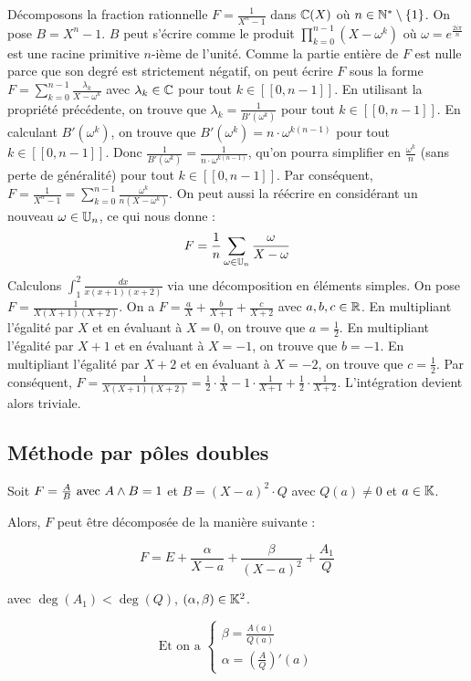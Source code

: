 \documentclass[12pt, a4paper]{report}
\begin{document}
\begin{example}
    \begin{outline}
        \1 Décomposons la fraction rationnelle $F = \frac{1}{X^n -1}$ dans $\mathbb{C}(X)$ où $n \in \mathbb{N}^*\setminus \{1\}$.
        \2 On pose $B= X^n - 1$.
        \2 $B$ peut s'écrire comme le produit $\prod_{k=0}^{n-1} (X - \omega^k)$ où $\omega = e^{\frac{2i\pi}{n}}$ est une racine primitive $n$-ième de l'unité.
        \2 Comme la partie entière de $F$ est nulle parce que son degré est strictement négatif, on peut écrire $F$ sous la forme $F = \sum_{k=0}^{n-1} \frac{\lambda_k}{X - \omega^k}$ avec $\lambda_k \in \mathbb{C}$ pour tout $k \in [\![0,n-1]\!]$.
        \2 En utilisant la propriété précédente, on trouve que $\lambda_k = \frac{1}{B'(\omega^k)}$ pour tout $k \in [\![0,n-1]\!]$.
        \2 En calculant $B'(\omega^k)$, on trouve que $B'(\omega^k) = n \cdot \omega^{k(n-1)}$ pour tout $k \in [\![0,n-1]\!]$.
        \2 Donc $\frac{1}{B'(\omega^k)} = \frac{1}{n \cdot \omega^{k(n-1)}}$, qu'on pourra simplifier en $\frac{\omega^k}{n}$ (sans perte de généralité) pour tout $k \in [\![0,n-1]\!]$.
        \2 Par conséquent, $F = \frac{1}{X^n - 1} = \sum_{k=0}^{n-1} \frac{\omega^k}{n(X - \omega^k)}$.
        \2 On peut aussi la réécrire en considérant un nouveau $\omega \in \mathbb{U}_n$, ce qui nous donne :
        $$F = \frac1n \sum_{\omega \in \mathbb{U}_n} \frac{\omega}{X - \omega}$$
        \1 Calculons $\int_1^2 \frac{dx}{x(x+1)(x+2)}$ via une décomposition en éléments simples.
        \2 On pose $F = \frac{1}{X(X+1)(X+2)}$.
        \2 On a $F = \frac{a}{X} + \frac{b}{X+1} + \frac{c}{X+2}$ avec $a,b,c \in \mathbb{R}$.
        \2 En multipliant l'égalité par $X$ et en évaluant à $X=0$, on trouve que $a = \frac12$.
        \2 En multipliant l'égalité par $X+1$ et en évaluant à $X=-1$, on trouve que $b = -1$.
        \2 En multipliant l'égalité par $X+2$ et en évaluant à $X=-2$, on trouve que $c = \frac12$.
        \2 Par conséquent, $F = \frac{1}{X(X+1)(X+2)} = \frac12 \cdot \frac{1}{X} - 1 \cdot \frac{1}{X+1} + \frac12 \cdot \frac{1}{X+2}$.
        \2 L'intégration devient alors triviale.
    \end{outline}
\end{example}

\subsection{Méthode par pôles doubles}

\begin{property}
    Soit $F = \frac AB \text{ avec } A \wedge B = 1$ et $B = (X - a)^2 \cdot Q$ avec $Q(a) \neq 0$ et $a \in \mathbb{K}$.

    Alors, $F$ peut être décomposée de la manière suivante :

    $$F = E + \frac{\alpha}{X - a} + \frac{\beta}{(X - a)^2} + \frac{A_1}{Q}$$

    avec $\deg(A_1) < \deg(Q)$, $(\alpha,\beta) \in \mathbb{K}^2$.

    $$\text{Et on a } \begin{cases}
    \beta = \frac{A(a)}{Q(a)}\\
    \alpha = \left(\frac AQ\right)'(a)
    \end{cases}$$
\end{property}
\end{document}
